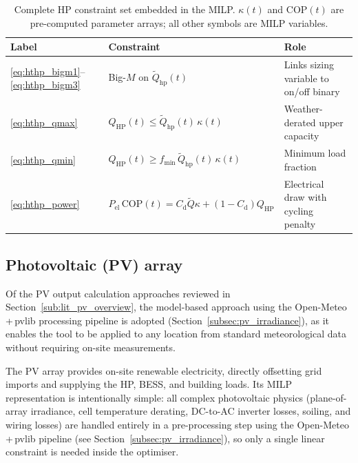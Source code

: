 \documentclass[11pt,a4paper]{report}
\begin{document}
\begin{table}[H]
\centering
\caption{Complete HP constraint set embedded in the MILP.
         $\kappa(t)$ and $\mathrm{COP}(t)$ are pre-computed parameter arrays;
         all other symbols are MILP variables.}
\label{tab:hthp_constraints}
\begin{tabular}{llp{5.5cm}}
\hline
\textbf{Label} & \textbf{Constraint} & \textbf{Role} \\
\hline
\eqref{eq:hthp_bigm1}--\eqref{eq:hthp_bigm3}
    & Big-$M$ on $\tilde{Q}_\mathrm{hp}(t)$
    & Links sizing variable to on/off binary \\
\eqref{eq:hthp_qmax}
    & $Q_\mathrm{HP}(t) \leq \tilde{Q}_\mathrm{hp}(t)\,\kappa(t)$
    & Weather-derated upper capacity \\
\eqref{eq:hthp_qmin}
    & $Q_\mathrm{HP}(t) \geq f_\mathrm{min}\,\tilde{Q}_\mathrm{hp}(t)\,\kappa(t)$
    & Minimum load fraction \\
\eqref{eq:hthp_power}
    & $P_\mathrm{el}\,\mathrm{COP}(t) = C_\mathrm{d}\tilde{Q}\kappa + (1-C_\mathrm{d})Q_\mathrm{HP}$
    & Electrical draw with cycling penalty \\
\hline
\end{tabular}
\end{table}

\subsection{Photovoltaic (PV) array}
\label{sec:pv_model}

Of the PV output calculation approaches reviewed in Section~\ref{sub:lit_pv_overview}, the model-based approach using the Open-Meteo\,+\,pvlib processing pipeline is adopted (Section~\ref{subsec:pv_irradiance}), as it enables the tool to be applied to any location from standard meteorological data without requiring on-site measurements.

The PV array provides on-site renewable electricity, directly offsetting grid imports and
supplying the HP, BESS, and building loads.
Its MILP representation is intentionally simple: all complex photovoltaic physics
(plane-of-array irradiance, cell temperature derating, DC-to-AC inverter losses,
soiling, and wiring losses) are handled entirely in a pre-processing step using the
Open-Meteo\,+\,pvlib pipeline (see Section~\ref{subsec:pv_irradiance}), so only a single
linear constraint is needed inside the optimiser.
\end{document}
